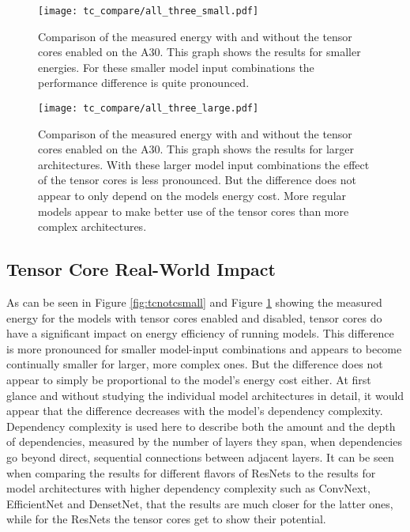 \documentclass[conference]{IEEEtran}
\begin{document}
\begin{figure}
    \texttt{[image: tc\_compare/all\_three\_small.pdf]}
    \caption{Comparison of the measured energy with and without the tensor cores enabled on the A30. This graph shows the results for smaller energies. For these smaller model input combinations the performance difference is quite pronounced.}
    \label{fig:tcnotcsmall}
    \texttt{[image: tc\_compare/all\_three\_large.pdf]}
    \caption{Comparison of the measured energy with and without the tensor cores enabled on the A30. This graph shows the results for larger architectures. With these larger model input combinations the effect of the tensor cores is less pronounced. But the difference does not appear to only depend on the models energy cost. More regular models appear to make better use of the tensor cores than more complex architectures.}
    \label{fig:tcnotclarge}
\end{figure}


\subsection{Tensor Core Real-World Impact}
As can be seen in Figure \ref{fig:tcnotcsmall} and Figure \ref{fig:tcnotclarge} showing the measured energy for the models with tensor cores enabled and disabled, tensor cores do have a significant impact on energy efficiency of running models. This difference is more pronounced for smaller model-input combinations and appears to become continually smaller for larger, more complex ones. But the difference does not appear to simply be proportional to the model's energy cost either. At first glance and without studying the individual model architectures in detail, it would appear that the difference decreases with the model's dependency complexity. Dependency complexity is used here to describe both the amount and the depth of dependencies, measured by the number of layers they span, when dependencies go beyond direct, sequential connections between adjacent layers. It can be seen when comparing the results for different flavors of ResNets to the results for model architectures with higher dependency complexity such as ConvNext, EfficientNet and DensetNet, that the results are much closer for the latter ones, while for the ResNets the tensor cores get to show their potential.
\end{document}
